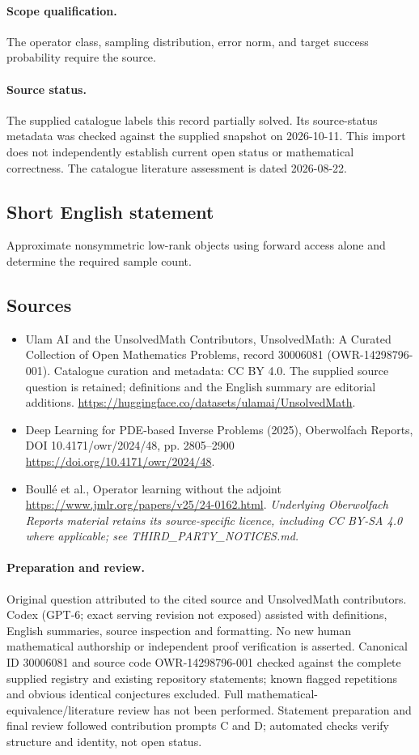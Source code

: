 \documentclass[11pt]{article}
\begin{document}
\paragraph{Scope qualification.}
The operator class, sampling distribution, error norm, and target success probability require the source.
\paragraph{Source status.}
The supplied catalogue labels this record partially solved. Its source-status metadata was checked against the supplied snapshot on 2026-10-11. This import does not independently establish current open status or mathematical correctness. The catalogue literature assessment is dated 2026-08-22.
\subsection{Short English statement}
Approximate nonsymmetric low-rank objects using forward access alone and determine the required sample count.
\subsection{Sources}
\begin{itemize}
\item[S1] Ulam AI and the UnsolvedMath Contributors, UnsolvedMath: A Curated Collection of Open Mathematics Problems, record 30006081 (OWR-14298796-001). Catalogue curation and metadata: CC BY 4.0. The supplied source question is retained; definitions and the English summary are editorial additions.
\url{https://huggingface.co/datasets/ulamai/UnsolvedMath}.
\item[S2] Deep Learning for PDE-based Inverse Problems (2025), Oberwolfach Reports, DOI 10.4171/owr/2024/48, pp. 2805--2900
\url{https://doi.org/10.4171/owr/2024/48}.
\item[S3] Boullé et al., Operator learning without the adjoint
\url{https://www.jmlr.org/papers/v25/24-0162.html}.
\textit{Underlying Oberwolfach Reports material retains its source-specific licence, including CC BY-SA 4.0 where applicable; see THIRD\_PARTY\_NOTICES.md.}
\end{itemize}
\paragraph{Preparation and review.}
Original question attributed to the cited source and UnsolvedMath contributors. Codex (GPT-6; exact serving revision not exposed) assisted with definitions, English summaries, source inspection and formatting. No new human mathematical authorship or independent proof verification is asserted. Canonical ID 30006081 and source code OWR-14298796-001 checked against the complete supplied registry and existing repository statements; known flagged repetitions and obvious identical conjectures excluded. Full mathematical-equivalence/literature review has not been performed. Statement preparation and final review followed contribution prompts C and D; automated checks verify structure and identity, not open status.
\label{end:30006081}
\end{document}

